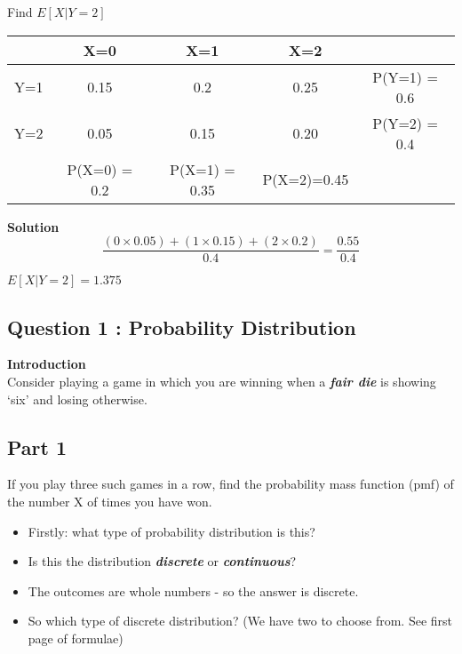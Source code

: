 \documentclass[]{report}
\begin{document}
\begin{enumerate}[(i)]
\begin{itemize}
Find $E[X|Y=2]$

\begin{tabular}{ccccc}
	& X=0  & X=1  & X=2  &              \\ \hline
	Y=1 & 0.15 & 0.2  & 0.25 & P(Y=1) = 0.6 \\ \hline
	Y=2 & 0.05 & 0.15 & 0.20 & P(Y=2) = 0.4 \\ \hline
	& P(X=0) = 0.2  & P(X=1) = 0.35  & P(X=2)=0.45  &              \\ \hline
\end{tabular}



\textbf{Solution}
\[   \frac{(0 \times 0.05) + (1 \times 0.15)+(2 \times 0.2) }{0.4}  = \frac{0.55}{0.4}  \] 

$E[X|Y=2] = 1.375$





\subsection{Question 1 : Probability Distribution}

\noindent \textbf{Introduction}\\

Consider playing a game in which you are winning when a \textbf{\emph{fair die}} is showing `six'
and losing otherwise.

\subsection{Part 1}If you play three such games in a row, find the probability mass function (pmf) of the number
X of times you have won.

{
	\begin{itemize}
		\item Firstly: what type of probability distribution is this?
		
		\item Is this the distribution \textbf{\emph{discrete}} or  \textbf{\emph{continuous}}?
		
		\item The outcomes are whole numbers - so the answer is discrete.
		
		\item So which type of discrete distribution? (We have two to choose from. See first page of formulae)
		

\end{itemize}}
\end{itemize}
\end{enumerate}
\end{document}
